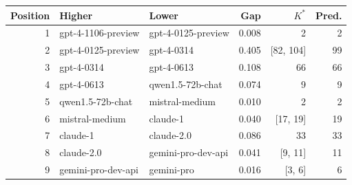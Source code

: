 \begin{tabular}{rllrrr}
\toprule
Position & Higher & Lower & Gap & $K^*$ & Pred. \\
\midrule
1 & gpt-4-1106-preview & gpt-4-0125-preview & 0.008 & 2 & 2 \\
2 & gpt-4-0125-preview & gpt-4-0314 & 0.405 & [82, 104] & 99 \\
3 & gpt-4-0314 & gpt-4-0613 & 0.108 & 66 & 66 \\
4 & gpt-4-0613 & qwen1.5-72b-chat & 0.074 & 9 & 9 \\
5 & qwen1.5-72b-chat & mistral-medium & 0.010 & 2 & 2 \\
6 & mistral-medium & claude-1 & 0.040 & [17, 19] & 19 \\
7 & claude-1 & claude-2.0 & 0.086 & 33 & 33 \\
8 & claude-2.0 & gemini-pro-dev-api & 0.041 & [9, 11] & 11 \\
9 & gemini-pro-dev-api & gemini-pro & 0.016 & [3, 6] & 6 \\
\bottomrule
\end{tabular}
